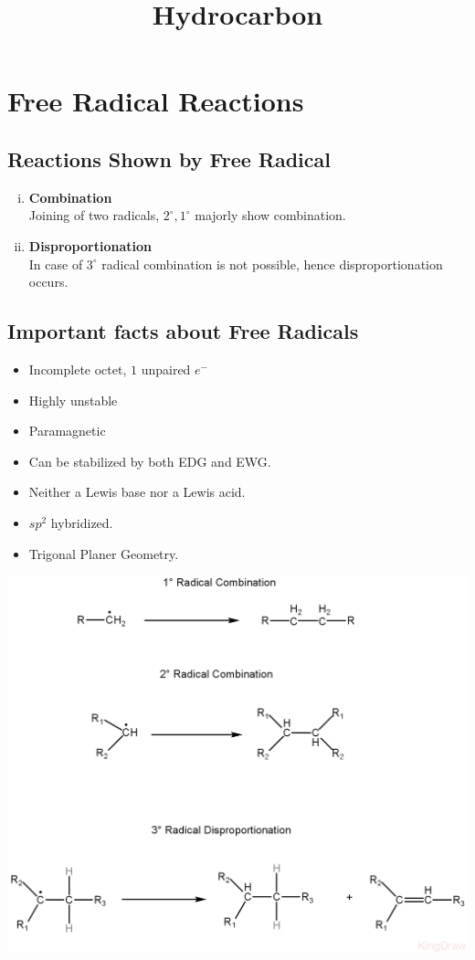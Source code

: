 \documentclass{article}
\title{Hydrocarbon}
\author{}
\date{}
\begin{document}
\maketitle

\section{Free Radical Reactions}

\subsection{Reactions Shown by Free Radical}
\begin{enumerate}[i.]
    \item \textbf{Combination} \\
          Joining of two radicals, $2^\circ, 1^\circ$ majorly show combination.
    \item \textbf{Disproportionation} \\
          In case of $3^\circ$ radical combination is not possible, hence disproportionation occurs.
\end{enumerate}

\subsection{Important facts about Free Radicals}
\begin{itemize}
    \item Incomplete octet, $1$ unpaired $e^-$
    \item Highly unstable
    \item Paramagnetic
    \item Can be stabilized by both EDG and EWG.
    \item Neither a Lewis base nor a Lewis acid.
    \item $sp^2$ hybridized.
    \item Trigonal Planer Geometry.
\end{itemize}
\pagebreak
\begin{center}
    \includegraphics[scale=0.3]{FreeRadicalReaction(1)_1722161083701.JPEG}
\end{center}
\end{document}
